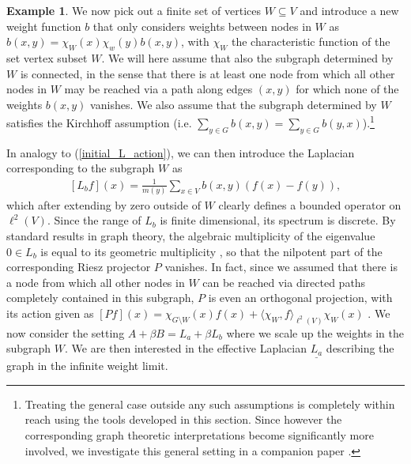 \documentclass[reqno,12pt,letterpaper]{amsart}
\numberwithin{equation}{section}
\newcommand{\1}{\mathds{1}}
\theoremstyle{definition}
\newtheorem{Ex}[Th]{Example}
\begin{document}
\begin{Ex}
We now pick out a  finite set of vertices $W \subseteq V$ and introduce a new weight function $b$ that only considers weights between nodes in $W$ as
$
b(x,y) = \chi_W(x) \chi_w(y)	b(x,y)
$,
with $\chi_W$ the characteristic function of the set vertex subset $W$. We will here assume that also the subgraph determined by $W$ is connected, in the sense that there is at least one node from which all other nodes in $W$ may be reached via a path along edges $(x,y)$ for which none of the weights $b(x,y)$ vanishes.  We also assume that the subgraph determined by $W$ satisfies the Kirchhoff assumption (i.e. $\sum_{y \in G} b(x,y) = \sum_{y \in G} b(y,x)$).\footnote{Treating the general case outside any such assumptions is completely within reach using the tools developed in this section.
	Since however the corresponding graph theoretic interpretations become significantly more involved, we investigate this general setting 
in a companion paper \cite{koke_graph26}.} 

 
 In analogy to (\ref{initial_L_action}), we can then introduce the  Laplacian corresponding to the subgraph $W$ as
 \begin{align}\label{initial_L_action_finite}
	[L_bf](x) = \frac{1}{m(y)} \sum\limits_{x \in V} b(x,y) (f(x) - f(y)),
\end{align}
which after extending by zero outside of $W$ clearly defines a bounded operator on $\ell^2(V)$. 
Since the range of $L_b$ is finite dimensional, its spectrum is discrete. By standard results in graph theory, the algebraic multiplicity of the eigenvalue $0 \in L_b$ is equal to its geometric multiplicity \cite{CaughmanVeerman2006}, so that the nilpotent part of the corresponding Riesz projector $P$ vanishes. In fact, since we assumed that there is a node from which all other nodes in $W$ can be reached via directed paths completely contained in this subgraph, $P$ is even an orthogonal projection, with its action given as $[Pf](x) = \chi_{G \setminus W}(x)f(x) +     \langle \chi_W,f \rangle_{\ell^2(V)} \chi_W(x)$ \cite{Veerman2020APO}. We now consider the setting $A + \beta B = L_a + \beta L_b$ where we scale up the weights in the subgraph $W$. 
We are then interested in the effective Laplacian $\underline{L_a}$ describing the graph in the infinite weight limit. 



\end{Ex}
\end{document}
